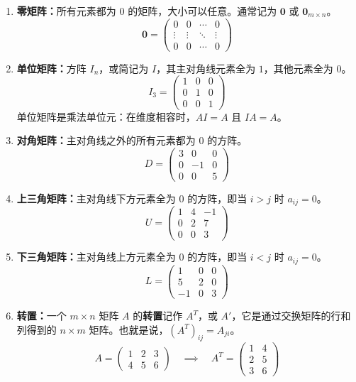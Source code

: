 \begin{enumerate}
    \item \textbf{零矩阵：}所有元素都为 $0$ 的矩阵，大小可以任意。通常记为 $\mathbf{0}$ 或 $\mathbf{0}_{m\times n}$。
    \[ \mathbf{0} = \begin{pmatrix} 0 & 0 & \cdots & 0 \\ \vdots & \vdots & \ddots & \vdots \\ 0 & 0 & \cdots & 0 \end{pmatrix} \]
    \item \textbf{单位矩阵：}方阵 $I_n$，或简记为 $I$，其主对角线元素全为 $1$，其他元素全为 $0$。
    \[ I_3 = \begin{pmatrix} 1 & 0 & 0 \\ 0 & 1 & 0 \\ 0 & 0 & 1 \end{pmatrix} \]
    单位矩阵是乘法单位元：在维度相容时，$AI=A$ 且 $IA=A$。
    \item \textbf{对角矩阵：}主对角线之外的所有元素都为 $0$ 的方阵。
    \[ D = \begin{pmatrix} 3 & 0 & 0 \\ 0 & -1 & 0 \\ 0 & 0 & 5 \end{pmatrix} \]
    \item \textbf{上三角矩阵：}主对角线下方元素全为 $0$ 的方阵，即当 $i>j$ 时 $a_{ij}=0$。
    \[ U = \begin{pmatrix} 1 & 4 & -1 \\ 0 & 2 & 7 \\ 0 & 0 & 3 \end{pmatrix} \]
    \item \textbf{下三角矩阵：}主对角线上方元素全为 $0$ 的方阵，即当 $i<j$ 时 $a_{ij}=0$。
    \[ L = \begin{pmatrix} 1 & 0 & 0 \\ 5 & 2 & 0 \\ -1 & 0 & 3 \end{pmatrix} \]
    \item \textbf{转置：}一个 $m\times n$ 矩阵 $A$ 的\textbf{转置}记作 $A^T$，或 $A'$，它是通过交换矩阵的行和列得到的 $n\times m$ 矩阵。也就是说，$(A^T)_{ij}=A_{ji}$。
    \[ A = \begin{pmatrix} 1 & 2 & 3 \\ 4 & 5 & 6 \end{pmatrix} \quad \implies \quad A^T = \begin{pmatrix} 1 & 4 \\ 2 & 5 \\ 3 & 6 \end{pmatrix} \]

\end{enumerate}
